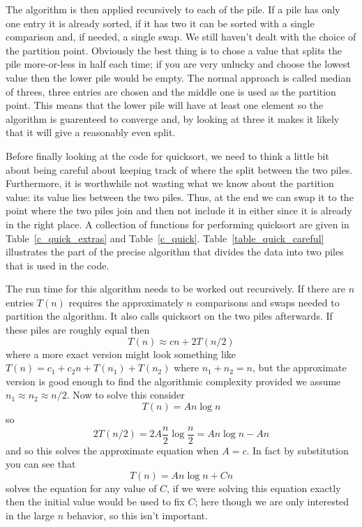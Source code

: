 \documentclass[11pt,a4paper]{scrartcl}
\begin{document}
The algorithm is then applied recursively to each of the pile. If a
pile has only one entry it is already sorted, if it has two it can be
sorted with a single comparison and, if needed, a single swap. We still
haven't dealt with the choice of the partition point. Obviously the
best thing is to chose a value that splits the pile more-or-less in
half each time; if you are very unlucky and choose the lowest value
then the lower pile would be empty. The normal approach is called
median of threes, three entries are chosen and the middle one is used
as the partition point. This means that the lower pile will have at
least one element so the algorithm is guarenteed to converge and, by
looking at three it makes it likely that it will give a reasonably
even split.

Before finally looking at the code for quicksort, we need to think a
little bit about being careful about keeping track of where the split
between the two piles. Furthermore, it is worthwhile not wasting what
we know about the partition value: its value lies between the two
piles. Thus, at the end we can swap it to the point where the two
piles join and then not include it in either since it is already in
the right place. A collection of functions for performing quicksort
are given in Table~\ref{c_quick_extras} and
Table~\ref{c_quick}. Table~\ref{table_quick_careful} illustrates
the part of the precise algorithm that divides the data into two piles
that is used in the code.

The run time for this algorithm needs to be worked out recursively. If
there are $n$ entries $T(n)$ requires the approximately $n$
comparisons and swaps needed to partition the algorithm. It also calls
quicksort on the two piles afterwards. If these piles are roughly
equal then
\begin{equation}
T(n)\approx cn+2T(n/2)
\end{equation}
where a more exact version might look something like $T(n)=c_1+c_2n +
T(n_1)+T(n_2)$ where $n_1+n_2=n$, but the approximate version is good
enough to find the algorithmic complexity provided we assume
$n_1\approx n_2\approx n/2$. Now to solve this consider 
\begin{equation}
T(n)=An\log{n}
\end{equation}
so
\begin{equation}
2T(n/2)=2A\frac{n}{2}\log{\frac{n}{2}}=An\log{n}-An
\end{equation}
and so this solves the approximate equation when $A=c$. In fact by substitution you can see that
\begin{equation}
T(n)=An\log{n}+Cn
\end{equation}
solves the equation for any value of $C$, if we were solving this
equation exactly then the initial value would be used to fix $C$; here
though we are only interested in the large $n$ behavior, so this isn't
important.
\end{document}
